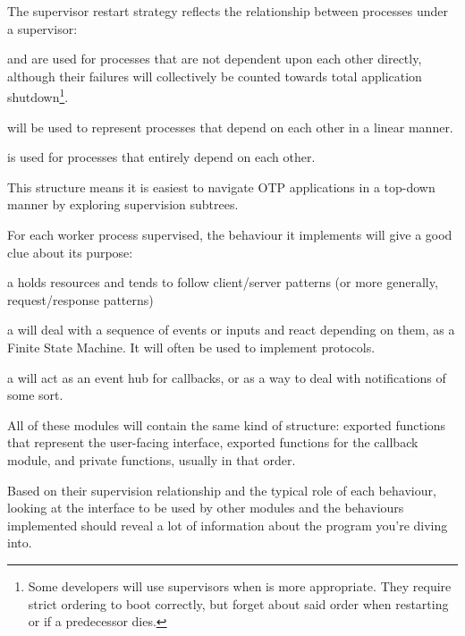 The supervisor restart strategy reflects the relationship between processes under a supervisor:

\begin{itemize*}
	\item {} and  are used for processes that are not dependent upon each other directly, although their failures will collectively be counted towards total application shutdown\footnote{Some developers will use  supervisors when  is more appropriate. They require strict ordering to boot correctly, but forget about said order when restarting or if a predecessor dies.}.
	\item {} will be used to represent processes that depend on each other in a linear manner.
	\item {} is used for processes that entirely depend on each other.
\end{itemize*}

This structure means it is easiest to navigate OTP applications in a top-down manner by exploring supervision subtrees. 

For each worker process supervised, the behaviour it implements will give a good clue about its purpose:

\begin{itemize*}
	\item a  holds resources and tends to follow client/server patterns (or more generally, request/response patterns)
	\item a  will deal with a sequence of events or inputs and react depending on them, as a Finite State Machine. It will often be used to implement protocols.
	\item a  will act as an event hub for callbacks, or as a way to deal with notifications of some sort.
\end{itemize*}

All of these modules will contain the same kind of structure: exported functions that represent the user-facing interface, exported functions for the callback module, and private functions, usually in that order.

Based on their supervision relationship and the typical role of each behaviour, looking at the interface to be used by other modules and the behaviours implemented should reveal a lot of information about the program you're diving into.


